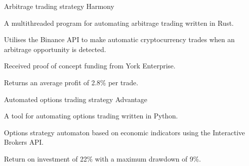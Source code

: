 
\begin{cventries}
  \cventry
    {Arbitrage trading strategy} %
    {Harmony} %
    {} %
    {} %
    {
      \begin{cvitems} %
        \item {A multithreaded program for automating arbitrage trading written in Rust.}
        \vspace{0.5mm}
		\item {Utilises the Binance API to make automatic cryptocurrency trades when an arbitrage opportunity is detected.}
		\vspace{0.5mm}
		\item {Received proof of concept funding from York Enterprise.}
		\vspace{0.5mm}
		\item {Returns an average profit of 2.8\% per trade.}
      \end{cvitems}
    }

  \cventry
    {Automated options trading strategy}
    {Advantage}
    {}
    {}
    {
      \begin{cvitems}
        \item {A tool for automating options trading written in Python.}
        \vspace{0.5mm}
		\item {Options strategy automaton based on economic indicators using the Interactive Brokers API.}
		\vspace{0.5mm}
		\item {Return on investment of 22\% with a maximum drawdown of 9\%.}
      \end{cvitems}
    }
\end{cventries}